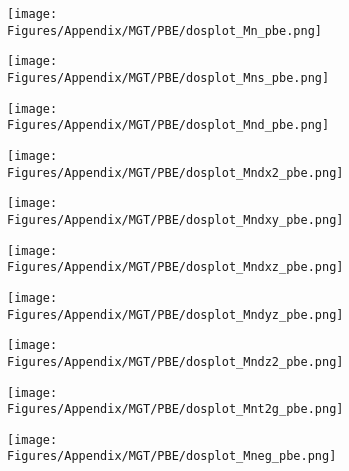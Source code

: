 \newpage
\begin{figure}[H]
\centering
\begin{subfigure}{0.24\textwidth}
    \centering
    \texttt{[image: Figures/Appendix/MGT/PBE/dosplot\_Mn\_pbe.png]}
    \label{dosplot_Mn_pbe}
\end{subfigure}
\hfill
\begin{subfigure}{0.24\textwidth}
\centering
    \texttt{[image: Figures/Appendix/MGT/PBE/dosplot\_Mns\_pbe.png]}
    \label{dosplot_Mns_pbe}
\end{subfigure}
\hfill
\begin{subfigure}{0.24\textwidth}
    \texttt{[image: Figures/Appendix/MGT/PBE/dosplot\_Mnd\_pbe.png]}
    \label{dosplot_Mnd_pbe}
\end{subfigure}
\hfill
\begin{subfigure}{0.24\textwidth}
    \texttt{[image: Figures/Appendix/MGT/PBE/dosplot\_Mndx2\_pbe.png]}
    \label{dodosplot_Mndx2_pbe}
\end{subfigure}
\hfill
\begin{subfigure}{0.24\textwidth}
    \texttt{[image: Figures/Appendix/MGT/PBE/dosplot\_Mndxy\_pbe.png]}
    \label{dosplot_Mndxy_pbe}
\end{subfigure}
\hfill
\begin{subfigure}{0.24\textwidth}
    \texttt{[image: Figures/Appendix/MGT/PBE/dosplot\_Mndxz\_pbe.png]}
    \label{dosplot_Mndxz_pbe}
\end{subfigure}
\hfill
\begin{subfigure}{0.24\textwidth}
    \texttt{[image: Figures/Appendix/MGT/PBE/dosplot\_Mndyz\_pbe.png]}
    \label{dosplot_Mndyz_pbe}
\end{subfigure}
\hfill
\begin{subfigure}{0.24\textwidth}
    \texttt{[image: Figures/Appendix/MGT/PBE/dosplot\_Mndz2\_pbe.png]}
    \label{dosplot_Mndz2_pbe}
\end{subfigure}
\hfill
\begin{subfigure}{0.24\textwidth}
    \texttt{[image: Figures/Appendix/MGT/PBE/dosplot\_Mnt2g\_pbe.png]}
    \label{dosplot_Mnt2g_pbe}
\end{subfigure}
\hfill
\begin{subfigure}{0.24\textwidth}
    \texttt{[image: Figures/Appendix/MGT/PBE/dosplot\_Mneg\_pbe.png]}

\end{subfigure}
\end{figure}

